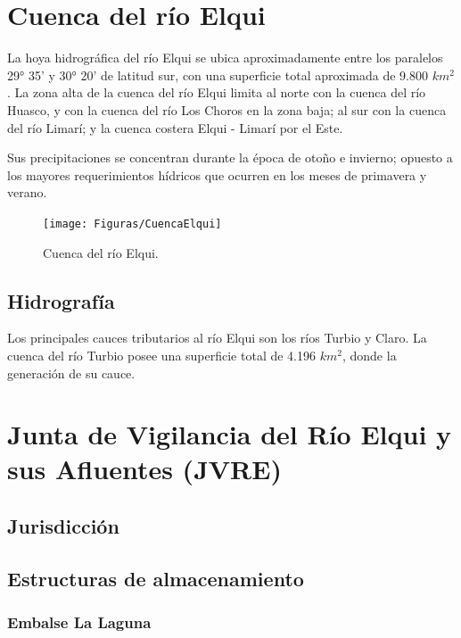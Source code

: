 \documentclass[10pt,]{article}
\begin{document}
\section{Cuenca del río Elqui}\bigskip

La hoya hidrográfica del río Elqui se ubica aproximadamente entre los paralelos 29° 35' y 30° 20' de latitud sur, con una superficie total aproximada de 9.800 $km^2$. La zona alta de la cuenca  del río Elqui limita al norte con la cuenca del río Huasco, y con la cuenca del río Los Choros en la zona baja; al sur con la cuenca del río Limarí; y la cuenca costera Elqui - Limarí por el Este.\bigskip

Sus precipitaciones se concentran durante la época de otoño e invierno; opuesto a los mayores requerimientos hídricos que ocurren en los meses de primavera y verano.



\begin{figure}[!h]
\begin{center}
\texttt{[image: Figuras/CuencaElqui]}
\caption{Cuenca del río Elqui.}
\label{etiqueta_figura1}
\end{center}
\end{figure}

		\subsection{Hidrografía}\bigskip
		
		Los principales cauces tributarios al río Elqui son los ríos Turbio y Claro. La cuenca del río Turbio posee una superficie total de 4.196 $km^2$, donde la generación de su cauce.
		
\section{Junta de Vigilancia del Río Elqui y sus Afluentes (JVRE)}\bigskip

		\subsection{Jurisdicción}
		
		\subsection{Estructuras de almacenamiento}\bigskip

			\subsubsection{Embalse La Laguna}
\end{document}
